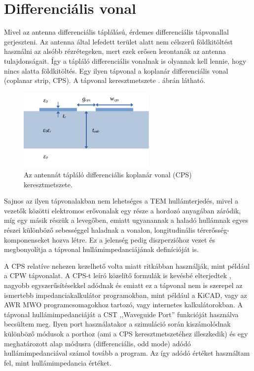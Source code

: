 \section{Differenciális vonal}
Mivel az antenna differenciális táplálású, érdemes differenciális tápvonallal gerjeszteni. Az antenna által lefedett terület alatt nem célszerű földkitöltést használni az alsóbb rézrétegeken, mert ezek erősen lerontanák az antenna tulajdonságait. Így a tápláló differenciális vonalnak is olyannak kell lennie, hogy nincs alatta földkitöltés. Egy ilyen tápvonal a koplanár differenciális vonal (coplanar strip, CPS). A tápvonal keresztmetszete . ábrán látható.
\begin{figure}[h]
	\centering
	\includegraphics[width=0.6\textwidth]{kep/cps.pdf}
	\caption{Az antennát tápláló differenciális koplanár vonal (CPS) keresztmetszete.}
	\label{fig:cps}
\end{figure}
\par Sajnos az ilyen tápvonalakban nem lehetséges a TEM hullámterjedés, mivel a vezetők közötti elektromos erővonalak egy része a hordozó anyagában záródik, míg egy másik részük a levegőben, emiatt ugyanannak a haladó hullámnak egyes részei különböző sebességgel haladnak a vonalon, longitudinális térerősség-komponenseket hozva létre. Ez a jelenség pedig diszperzióhoz vezet és megbonyolítja a tápvonal hullámimpedanciájának definícióját is.
\par A CPS relatíve nehezen kezelhető volta miatt ritkábban használják, mint például a CPW tápvonalat. A CPS-t leíró közelítő formulák is kevésbé elterjedtek \cite{coupled-slots, analytical}, nagyobb egyszerűsítésekkel adódnak és emiatt ez a tápvonal nem is szerepel az ismertebb impedanciakalkulátor programokban, mint például a KiCAD, vagy az AWR MWO programcsomagokhoz tartozó, vagy internetes kalkulátorokban. A tápvonal hullámimpedanciáját a CST ,,Waveguide Port'' funkcióját használva becsültem meg. Ilyen port használatakor a szimuláció során kiszámolódnak különböző módusok a porthoz (ami a CPS keresztmetszetéhez illeszkedik) és egy meghatározott alap módusra (differenciális, odd mode) adódó hullámimpedanciával számol tovább a program. Az így adódó értéket használtam fel, mint hullámimpedancia értéket.
